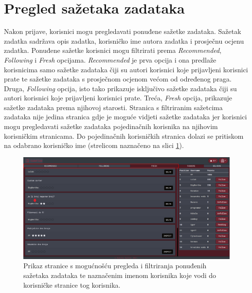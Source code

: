 \documentclass[times, utf8, zavrsni, numeric]{fer}
\begin{document}
		\section{Pregled sažetaka zadataka}
		\label{sec:sazetak}
		Nakon prijave, korisnici mogu pregledavati ponuđene sažetke zadataka. Sažetak zadatka sadržava opis zadatka, korisničko ime autora zadatka i prosječnu ocjenu zadatka. Ponuđene sažetke korisnici mogu filtrirati prema \textit{Recommended}, \textit{Following} i  \textit{Fresh} opcijama. \textit{Recommended} je prva opcija i ona predlaže korisnicima samo sažetke zadataka čiji su autori korisnici koje prijavljeni korisnici prate te sažetke zadataka s prosječnom ocjenom većom od određenog praga. Druga, \textit{Following} opcija, isto tako prikazuje isključivo sažetke zadataka čiji su autori korisnici koje prijavljeni korisnici prate. Treća, \textit{Fresh} opcija, prikazuje sažetke zadataka prema njihovoj starosti. Stranica s filtriranim sažetcima zadataka nije jedina stranica gdje je moguće vidjeti sažetke zadataka jer korisnici mogu pregledavati sažetke zadataka pojedinačnih korisnika na njihovim korisničkim stranicama. Do pojedinačnih korisničkih stranica dolazi se pritiskom na odabrano korisničko ime (strelicom naznačeno na slici \ref{fig:pregled}).
		\begin{figure}[H]
			\centering
			\includegraphics[width=\linewidth]{pictures/koristenje/Pregled.png}
			\caption{Prikaz stranice s mogućnošću pregleda i filtriranja ponuđenih sažetaka zadataka te naznačenim imenom korisnika koje vodi do korisničke stranice tog korisnika.}
			\label{fig:pregled}
		\end{figure}
	
\end{document}
